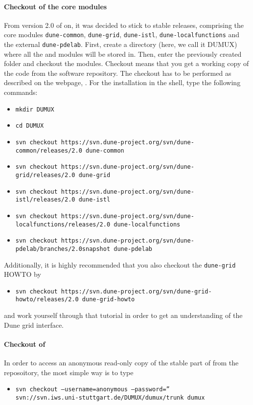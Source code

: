\paragraph{Checkout of the core modules}
From version 2.0 of \Dune on, it was decided to stick to stable \Dune releases, comprising the core modules 
\texttt{dune-common}, \texttt{dune-grid}, \texttt{dune-istl}, \texttt{dune-localfunctions} and the external \texttt{dune-pdelab}.  
First, create a directory (here, we call it DUMUX) where all the \Dune and \Dumux modules will be stored in. Then, enter the previously created folder and checkout the modules. Checkout means that you get a working copy of the code from the software repository. 
The checkout has to be performed as described on the \Dune webpage, \cite{DUNE-HP}. For the installation in the shell, type the following commands:
\begin{itemize}
\item \texttt{mkdir DUMUX}
\item \texttt{cd DUMUX}
\item \texttt{svn checkout https://svn.dune-project.org/svn/dune-common/releases/2.0 dune-common}
\item \texttt{svn checkout https://svn.dune-project.org/svn/dune-grid/releases/2.0 dune-grid}
\item \texttt{svn checkout https://svn.dune-project.org/svn/dune-istl/releases/2.0 dune-istl}
\item \texttt{svn checkout https://svn.dune-project.org/svn/dune-localfunctions/releases/2.0 dune-localfunctions}
\item \texttt{svn checkout https://svn.dune-project.org/svn/dune-pdelab/branches/2.0snapshot dune-pdelab}
\end{itemize} 

Additionally, it is highly recommended that you also checkout the \texttt{dune-grid} HOWTO by 
\begin{itemize}
\item \texttt{svn checkout https://svn.dune-project.org/svn/dune-grid-howto/releases/2.0 dune-grid-howto}
\end{itemize}
and work yourself through that tutorial in order to get an understanding of the Dune grid interface. 

\paragraph{Checkout of \Dumux}

In order to access an anonymous read-only copy of the stable part of \Dumux from the reposoitory, the most simple way is to type
\begin{itemize}
\item \texttt{svn checkout --username=anonymous --password='' \\ 
svn://svn.iws.uni-stuttgart.de/DUMUX/dumux/trunk dumux}
\end{itemize}

